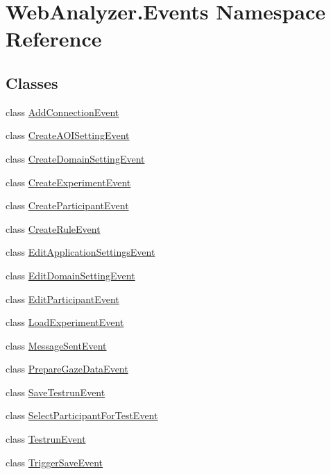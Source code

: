 \hypertarget{namespace_web_analyzer_1_1_events}{}\section{Web\+Analyzer.\+Events Namespace Reference}
\label{namespace_web_analyzer_1_1_events}
\subsection*{Classes}
\begin{DoxyCompactItemize}
\item 
class \hyperlink{class_web_analyzer_1_1_events_1_1_add_connection_event}{Add\+Connection\+Event}
\item 
class \hyperlink{class_web_analyzer_1_1_events_1_1_create_a_o_i_setting_event}{Create\+A\+O\+I\+Setting\+Event}
\item 
class \hyperlink{class_web_analyzer_1_1_events_1_1_create_domain_setting_event}{Create\+Domain\+Setting\+Event}
\item 
class \hyperlink{class_web_analyzer_1_1_events_1_1_create_experiment_event}{Create\+Experiment\+Event}
\item 
class \hyperlink{class_web_analyzer_1_1_events_1_1_create_participant_event}{Create\+Participant\+Event}
\item 
class \hyperlink{class_web_analyzer_1_1_events_1_1_create_rule_event}{Create\+Rule\+Event}
\item 
class \hyperlink{class_web_analyzer_1_1_events_1_1_edit_application_settings_event}{Edit\+Application\+Settings\+Event}
\item 
class \hyperlink{class_web_analyzer_1_1_events_1_1_edit_domain_setting_event}{Edit\+Domain\+Setting\+Event}
\item 
class \hyperlink{class_web_analyzer_1_1_events_1_1_edit_participant_event}{Edit\+Participant\+Event}
\item 
class \hyperlink{class_web_analyzer_1_1_events_1_1_load_experiment_event}{Load\+Experiment\+Event}
\item 
class \hyperlink{class_web_analyzer_1_1_events_1_1_message_sent_event}{Message\+Sent\+Event}
\item 
class \hyperlink{class_web_analyzer_1_1_events_1_1_prepare_gaze_data_event}{Prepare\+Gaze\+Data\+Event}
\item 
class \hyperlink{class_web_analyzer_1_1_events_1_1_save_testrun_event}{Save\+Testrun\+Event}
\item 
class \hyperlink{class_web_analyzer_1_1_events_1_1_select_participant_for_test_event}{Select\+Participant\+For\+Test\+Event}
\item 
class \hyperlink{class_web_analyzer_1_1_events_1_1_testrun_event}{Testrun\+Event}
\item 
class \hyperlink{class_web_analyzer_1_1_events_1_1_trigger_save_event}{Trigger\+Save\+Event}
\end{DoxyCompactItemize}
